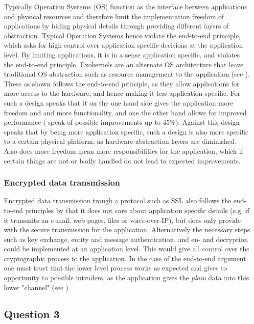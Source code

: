 \documentclass[12pt,a4paper,fleqn]{article}
\begin{document}
Typically Operation Systems (OS) function as the interface between applications and physical resources and therefore limit the implementation freedom of applications by hiding physical details through providing different layers of abstraction. Typical Operation Systems hence violate the end-to-end principle, which asks for high control over application specific decisions at the application level. By limiting applications, it is in a sense application specific, and violates the end-to-end principle. Exokernels are an alternate OS architecture that leave traditional OS abstraction such as resource management to the application (see \cite{Engler1995}). These as shown follows the end-to-end principle, as they allow applications for more access to the hardware, and hence making it less application specific. For such a design speaks that it on the one hand side gives the application more freedom and and more functionality, and one the other hand allows for improved performance (\cite{Engler1995} speak of possible improvements up to 45\%). Against this design speaks that by being more application specific, such a design is also more specific to a certain physical platform, as hardware abstraction layers are diminished. Also does more freedom mean more responsibilities for the application, which if certain things are not or badly handled do not lead to expected improvements.

\subsubsection*{Encrypted data transmission}

Encrypted data transmission trough a protocol such as SSL also follows the end-to-end principles by that it does not care about application specific details (e.g. if it transmits an e-mail, web pages, files or voice-over-IP), but does only provide with the secure transmission for the application. Alternatively the necessary steps such as key exchange, entity and message authentication, and en- and decryption could be implemented at an application level. This would give all control over the cryptographic process to the application. In the case of the end-to-end argument one must trust that the lower level process works as expected and gives to opportunity to possible intruders, as the application gives the \emph{plain} data into this lower "channel" (see \cite{Saltzer1984}).

\subsection*{Question 3}
\label{sec:eq3}
\end{document}
